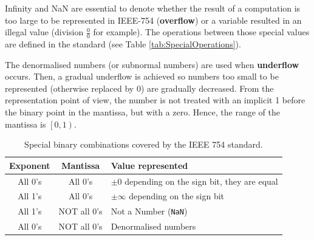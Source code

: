 Infinity and NaN are essential to denote whether the result of a computation is too large to be represented in IEEE-754 (\textbf{overflow}) or a variable resulted in an illegal value (division $\frac{0}{0}$ for example). The operations between those special values are defined in the standard (see Table \ref{tab:SpecialOperations}).

The denormalised numbers (or subnormal numbers) are used when \textbf{underflow} occurs. Then, a gradual underflow is achieved so numbers too small to be represented (otherwise replaced by 0) are gradually decreased. From the representation point of view, the number is not treated with an implicit 1 before the binary point in the mantissa, but with a zero. Hence, the range of the mantissa is $\left[ 0, 1\right)$.


\begin{table}
    \centering
    \begin{tabular}{| c | c | l |}
        \hline
        Exponent & Mantissa & Value represented \\ \hline
        All 0's  & All 0's & $\pm 0 $ depending on the sign bit, they are equal  \\ \hline
        All 1's  & All 0's & $\pm \infty$ depending on the sign bit \\ \hline
        All 1's & NOT all 0's & Not a Number (\texttt{NaN})  \\ \hline
        All 0's  & NOT all 0's & Denormalised numbers  \\ \hline
    \end{tabular}
    \caption{Special binary combinations covered by the IEEE 754 standard.}
    \label{tab:SpecialValues}
\end{table}

